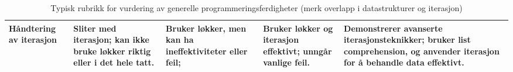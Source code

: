 \documentclass[12pt, titlepage]{article}
\begin{document}
\begin{landscape}
\begin{table}[h!]
\begin{tabular}{p{4cm} | p{4cm} | p{4cm} | p{4cm} | p{4cm}}
\midrule

\textbf{Håndtering av iterasjon} &
Sliter med iterasjon; kan ikke bruke løkker riktig eller i det hele tatt. &
Bruker løkker, men kan ha ineffektiviteter eller feil;&
Bruker løkker og iterasjon effektivt; unngår vanlige feil. &
Demonstrerer avanserte iterasjonsteknikker; bruker list comprehension, og anvender iterasjon for å behandle data effektivt. \\

\bottomrule
\end{tabular}
   \caption{Typisk rubrikk for vurdering av generelle programmeringsferdigheter (merk overlapp i datastrukturer og iterasjon)}
\end{table}


\end{landscape}
\end{document}
